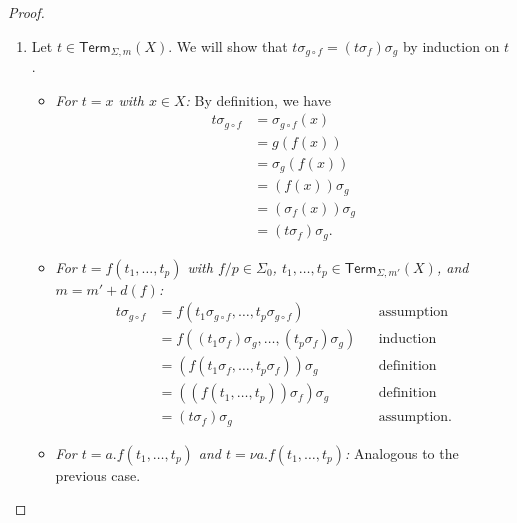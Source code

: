 \documentclass[a4paper,UKenglish,cleveref,thm-restate,numberwithinsect,final]{lipics-v2021}
\newcommand{\Term}{\mathsf{Term}}
\newcommand{\sig}{\Sigma}
\newcommand{\sigp}{\Sigma_0}
\theoremstyle{plain}
\newcommand{\id}{\mathit{id}}
\numberwithin{equation}{section}
\newcommand{\+}[1]{\mathcal{#1}\xspace}
\theoremstyle{definition}
\begin{document}
\begin{proof}
\begin{enumerate}[wide]
            As seen in \eqref{itm:freemodelfunctorequivariance}, we have \((F\id_X)_i([t]_m) = \llbracket t \rrbracket^\kappa_m\) for \(\kappa: X \to (FX)\) with \(\kappa(x) = \llbracket \id_X(x) \rrbracket^{\eta_X}_0 = \llbracket x \rrbracket^{\eta_X}_0 = \eta_X(x)\).
            Thus, \(\kappa = \eta_X\) and it follows from \cref{thm:canonicalenvironmentevaluation} that \((F\id_X)_i([t]_m) = [t]_m = \id([t]_m)\).
        \item
            Let \(t \in \Term_{\sig, m}(X)\).
            We will show that \(t\sigma_{g \circ f} = (t\sigma_f)\sigma_g\) by induction on \(t\).
            \begin{itemize}
                \item
                    \textit{For \(t = x\) with \(x \in X\):}
                    By definition, we have
                    \begin{align*}
                        t\sigma_{g \circ f}
                        &= \sigma_{g \circ f}(x) \\
                        &= g(f(x)) \\
                        &= \sigma_g(f(x)) \\
                        &= (f(x))\sigma_g \\
                        &= (\sigma_f(x))\sigma_g \\
                        &= (t\sigma_f)\sigma_g.
                    \end{align*}
                \item
                    \textit{For \(t = f(t_1, \ldots, t_p)\) with \(f/p \in \sigp\), \(t_1, \ldots, t_p \in \Term_{\sig, m'}(X)\), and \(m = m' + d(f)\):}
                    \begin{align*}
                        t\sigma_{g \circ f}
                        &= f(t_1\sigma_{g \circ f}, \ldots, t_p\sigma_{g \circ f}) && \text{assumption} \\
                        &= f((t_1\sigma_f)\sigma_g, \ldots, (t_p\sigma_f)\sigma_g) && \text{induction} \\
                        &= (f(t_1\sigma_f, \ldots, t_p\sigma_f))\sigma_g && \text{definition} \\
                        &= ((f(t_1, \ldots, t_p))\sigma_f)\sigma_g && \text{definition} \\
                        &= (t\sigma_f)\sigma_g && \text{assumption}.
                    \end{align*}
                \item
                    \textit{For \(t = a.f(t_1, \ldots, t_p)\) and \(t = \nu a.f(t_1, \ldots, t_p)\):}
                    Analogous to the previous case.
            \end{itemize}


\end{enumerate}
\end{proof}
\end{document}
